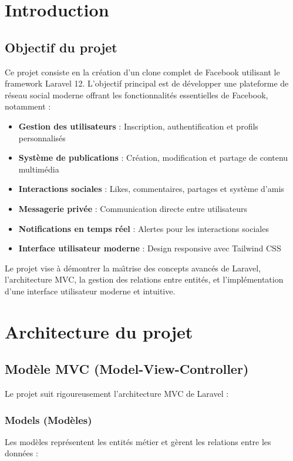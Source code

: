 \documentclass[12pt,a4paper]{article}
\begin{document}
\section{Introduction}

\subsection{Objectif du projet}

Ce projet consiste en la cr\'eation d'un clone complet de Facebook utilisant le framework Laravel 12. L'objectif principal est de d\'evelopper une plateforme de r\'eseau social moderne offrant les fonctionnalit\'es essentielles de Facebook, notamment :

\begin{itemize}
    \item \textbf{Gestion des utilisateurs} : Inscription, authentification et profils personnalis\'es
    \item \textbf{Syst\`eme de publications} : Cr\'eation, modification et partage de contenu multim\'edia
    \item \textbf{Interactions sociales} : Likes, commentaires, partages et syst\`eme d'amis
    \item \textbf{Messagerie priv\'ee} : Communication directe entre utilisateurs
    \item \textbf{Notifications en temps r\'eel} : Alertes pour les interactions sociales
    \item \textbf{Interface utilisateur moderne} : Design responsive avec Tailwind CSS
\end{itemize}

Le projet vise \`a d\'emontrer la ma\^{\i}trise des concepts avanc\'es de Laravel, l'architecture MVC, la gestion des relations entre entit\'es, et l'impl\'ementation d'une interface utilisateur moderne et intuitive.

\section{Architecture du projet}

\subsection{Mod\`ele MVC (Model-View-Controller)}

Le projet suit rigoureusement l'architecture MVC de Laravel :

\subsubsection{Models (Mod\`eles)}
Les mod\`eles repr\'esentent les entit\'es m\'etier et g\`erent les relations entre les donn\'ees :
\end{document}
